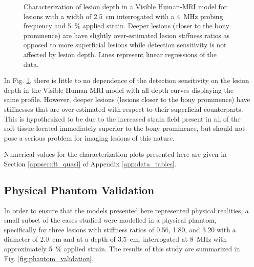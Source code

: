 			\begin{figure}[!htb]
				\centering
				\caption[Quasi-static characterization of lesion depth in a Visible Human model]{Characterization of lesion depth in a Visible Human-MRI model for lesions with a width of \SI{2.5}{\cm} interrogated with a \SI{4}{\MHz} probing frequency and \SI{5}{\percent} applied strain. Deeper lesions (closer to the bony prominence) are have slightly over-estimated lesion stiffness ratios as opposed to more superficial lesions while detection sensitivity is not affected by lesion depth. Lines represent linear regressions of the data.}
				\label{fig:human_depth_characterization}
			\end{figure}

			In Fig. \ref{fig:human_depth_characterization}, there is little to no dependence of the detection sensitivity on the lesion depth in the Visible Human-MRI model with all depth curves displaying the same profile. However, deeper lesions (lesions closer to the bony prominence) have stiffnesses that are over-estimated with respect to their superficial counterparts. This is hypothesized to be due to the increased strain field present in all of the soft tissue located immediately superior to the bony prominence, but should not pose a serious problem for imaging lesions of this nature.

			Numerical values for the characterization plots presented here are given in Section \ref{appsec:dt_quasi} of Appendix \ref{app:data_tables}.

		\subsection{Physical Phantom Validation}
			In order to ensure that the models presented here represented physical realities, a small subset of the cases studied were modelled in a physical phantom, specifically for three lesions with stiffness ratios of 0.56, 1.80, and 3.20 with a diameter of \SI{2.0}{\cm} and at a depth of \SI{3.5}{\cm}, interrogated at \SI{8}{\MHz} with approximately \SI{5}{\percent} applied strain. The results of this study are summarized in Fig. \ref{fig:phantom_validation}.


